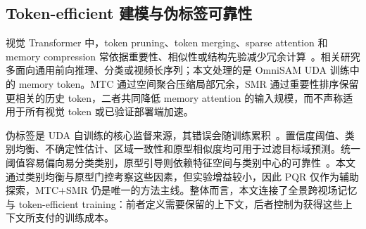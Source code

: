 \subsection{Token-efficient 建模与伪标签可靠性}
视觉 Transformer 中，token pruning、token merging、sparse attention 和 memory compression 常依据重要性、相似性或结构先验减少冗余计算~\cite{rao2021dynamicvit,bolya2023tome,lu2023tokensharing}。相关研究多面向通用前向推理、分类或视频长序列；本文处理的是 OmniSAM UDA 训练中的 memory token。MTC 通过空间聚合压缩局部冗余，SMR 通过重要性排序保留更相关的历史 token，二者共同降低 memory attention 的输入规模，而不声称适用于所有视觉 token 或已验证部署端加速。

伪标签是 UDA 自训练的核心监督来源，其错误会随训练累积~\cite{zou2018cbst,hoyer2023mic}。置信度阈值、类别均衡、不确定性估计、区域一致性和原型相似度均可用于过滤目标域预测。统一阈值容易偏向易分类类别，原型引导则依赖特征空间与类别中心的可靠性~\cite{zheng2024sfuda360,zheng2025sfuda360pp}。本文通过类别均衡与原型门控考察这些因素，但实验增益较小，因此 PQR 仅作为辅助探索，MTC+SMR 仍是唯一的方法主线。整体而言，本文连接了全景跨视场记忆与 token-efficient training：前者定义需要保留的上下文，后者控制为获得这些上下文所支付的训练成本。
